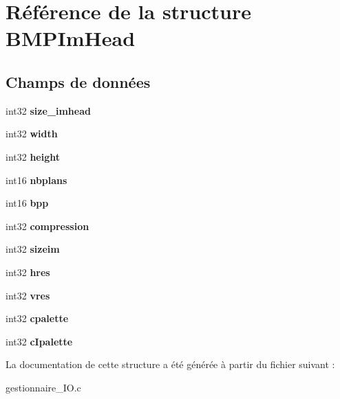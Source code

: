 \hypertarget{structBMPImHead}{}\section{Référence de la structure B\+M\+P\+Im\+Head}
\label{structBMPImHead}
\subsection*{Champs de données}
\begin{DoxyCompactItemize}
\item 
int32 {\bfseries size\+\_\+imhead}\hypertarget{structBMPImHead_a087db882c472efd632df406b8bca75aa}{}\label{structBMPImHead_a087db882c472efd632df406b8bca75aa}

\item 
int32 {\bfseries width}\hypertarget{structBMPImHead_ad77d6dd453ad6e0032b53ca9e02bd870}{}\label{structBMPImHead_ad77d6dd453ad6e0032b53ca9e02bd870}

\item 
int32 {\bfseries height}\hypertarget{structBMPImHead_abb7665f76c1c21700df1cd01c4f2fe7d}{}\label{structBMPImHead_abb7665f76c1c21700df1cd01c4f2fe7d}

\item 
int16 {\bfseries nbplans}\hypertarget{structBMPImHead_aa0dc40de38a2d515d99b6fdf7a8b5905}{}\label{structBMPImHead_aa0dc40de38a2d515d99b6fdf7a8b5905}

\item 
int16 {\bfseries bpp}\hypertarget{structBMPImHead_a8ab99ab71fcd3a4bdfbca32b9d68aebc}{}\label{structBMPImHead_a8ab99ab71fcd3a4bdfbca32b9d68aebc}

\item 
int32 {\bfseries compression}\hypertarget{structBMPImHead_a6243975b07502791c6633af57f1026ff}{}\label{structBMPImHead_a6243975b07502791c6633af57f1026ff}

\item 
int32 {\bfseries sizeim}\hypertarget{structBMPImHead_a0ac2156b38e1c53226aafde050189fe0}{}\label{structBMPImHead_a0ac2156b38e1c53226aafde050189fe0}

\item 
int32 {\bfseries hres}\hypertarget{structBMPImHead_a51803597f55adc3bc88a2337e9fb5439}{}\label{structBMPImHead_a51803597f55adc3bc88a2337e9fb5439}

\item 
int32 {\bfseries vres}\hypertarget{structBMPImHead_aa6b95a88db995470ac6ac439db7b1353}{}\label{structBMPImHead_aa6b95a88db995470ac6ac439db7b1353}

\item 
int32 {\bfseries cpalette}\hypertarget{structBMPImHead_a713742cf99ef4cf940950087ba4a4573}{}\label{structBMPImHead_a713742cf99ef4cf940950087ba4a4573}

\item 
int32 {\bfseries c\+Ipalette}\hypertarget{structBMPImHead_a182bbe31daf1af6e415d8c73635caace}{}\label{structBMPImHead_a182bbe31daf1af6e415d8c73635caace}

\end{DoxyCompactItemize}


La documentation de cette structure a été générée à partir du fichier suivant \+:\begin{DoxyCompactItemize}
\item 
gestionnaire\+\_\+\+I\+O.\+c\end{DoxyCompactItemize}
